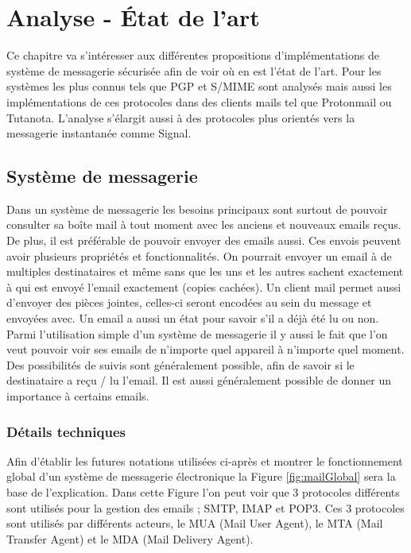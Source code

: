\chapter{Analyse - État de l'art}
\label{ch:analysis}
Ce chapitre va s'intéresser aux différentes propositions d'implémentations de système de messagerie sécurisée afin de voir où en est l'état de l'art. Pour les systèmes les plus connus tels que PGP et S/MIME sont analysés mais aussi les implémentations de ces protocoles dans des clients mails tel que Protonmail ou Tutanota. L'analyse s'élargit aussi à des protocoles plus orientés vers la messagerie instantanée comme Signal.

\section{Système de messagerie}
Dans un système de messagerie les besoins principaux sont surtout de pouvoir consulter sa boîte mail à tout moment avec les anciens et nouveaux emails reçus. De plus, il est préférable de pouvoir envoyer des emails aussi. Ces envois peuvent avoir plusieurs propriétés et fonctionnalités. On pourrait envoyer un email à de multiples destinataires et même sans que les uns et les autres sachent exactement à qui est envoyé l'email exactement (copies cachées). Un client mail permet aussi d'envoyer des pièces jointes, celles-ci seront encodées au sein du message et envoyées avec. Un email a aussi un état pour savoir s'il a déjà été lu ou non. Parmi l'utilisation simple d'un système de messagerie il y aussi le fait que l'on veut pouvoir voir ses emails de n'importe quel appareil à n'importe quel moment. Des possibilités de suivis sont généralement possible, afin de savoir si le destinataire a reçu / lu l'email. Il est aussi généralement possible de donner un importance à certains emails.

\subsection{Détails techniques}
Afin d'établir les futures notations utilisées ci-après et montrer le fonctionnement global d'un système de messagerie électronique la Figure \ref{fig:mailGlobal} sera la base de l'explication. Dans cette Figure l'on peut voir que 3 protocoles différents sont utilisés pour la gestion des emails ; SMTP, IMAP et POP3. Ces 3 protocoles sont utilisés par différents acteurs, le MUA (Mail User Agent), le MTA (Mail Transfer Agent) et le MDA (Mail Delivery Agent).

